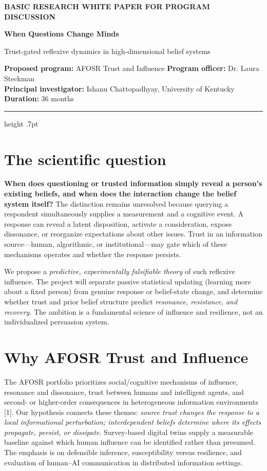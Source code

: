 \documentclass[10pt,letterpaper]{article}
\begin{document}
\vspace*{-9pt}
{\sffamily\color{teal}\bfseries\fontsize{9.5}{12}\selectfont BASIC RESEARCH WHITE PAPER \hfill FOR PROGRAM DISCUSSION}
\vspace{3pt}

{\sffamily\color{ink}\bfseries\fontsize{20}{22}\selectfont When Questions Change Minds}

{\sffamily\color{steel}\fontsize{13}{16}\selectfont Trust-gated reflexive dynamics in high-dimensional belief systems}
\vspace{3pt}

{\color{graytext}\fontsize{9}{11}\selectfont \textbf{Proposed program:} AFOSR Trust and Influence \quad \textbf{Program officer:} Dr. Laura Steckman\\
\textbf{Principal investigator:} Ishanu Chattopadhyay, University of Kentucky \quad \textbf{Duration:} 36 months}
\vspace{5pt}
\hrule height .7pt
\vspace{5pt}

\section*{The scientific question}
\textbf{When does questioning or trusted information simply reveal a person's existing beliefs, and when does the interaction change the belief system itself?} The distinction remains unresolved because querying a respondent simultaneously supplies a measurement and a cognitive event. A response can reveal a latent disposition, activate a consideration, expose dissonance, or reorganize expectations about other issues. Trust in an information source---human, algorithmic, or institutional---may gate which of these mechanisms operates and whether the response persists.

We propose a \emph{predictive, experimentally falsifiable theory} of such reflexive influence. The project will separate passive statistical updating (learning more about a fixed person) from genuine response or belief-state change, and determine whether trust and prior belief structure predict \emph{resonance, resistance, and recovery}. The ambition is a fundamental science of influence and resilience, not an individualized persuasion system.

\section*{Why AFOSR Trust and Influence}
The AFOSR portfolio prioritizes social/cognitive mechanisms of influence, resonance and dissonance, trust between humans and intelligent agents, and second- or higher-order consequences in heterogeneous information environments [1]. Our hypothesis connects these themes: \emph{source trust changes the response to a local informational perturbation; interdependent beliefs determine where its effects propagate, persist, or dissipate}. Survey-based digital twins supply a measurable baseline against which human influence can be identified rather than presumed. The emphasis is on defensible inference, susceptibility versus resilience, and evaluation of human--AI communication in distributed information settings.
\end{document}
